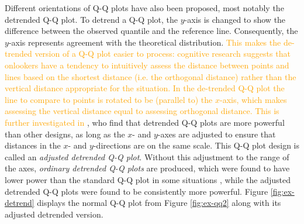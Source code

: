 Different orientations of Q-Q plots have also been proposed, most
notably the detrended Q-Q plot. To detrend a Q-Q plot, the \(y\)-axis is
changed to show the difference between the observed quantile and the
reference line. Consequently, the \(y\)-axis represents agreement with
the theoretical distribution.
{\textcolor{orange}{This makes the de-trended version of a Q-Q plot  easier to process: cognitive research \citep{sineillusion, robbins, cleveland} suggests that onlookers have a tendency to intuitively assess the distance between points and lines based on the shortest distance (i.e. the orthogonal distance) rather than the vertical distance appropriate for the situation. In the de-trended Q-Q plot the line to compare to points  is rotated to be (parallel to) the $x$-axis, which makes assessing the vertical distance equal to assessing orthogonal distance. }}
{\textcolor{orange}{This is further investigated in}}
\citet{Loy2016-fg}, who find that detrended Q-Q plots are more powerful
than other designs, as long as the \(x\)- and \(y\)-axes are adjusted to
ensure that distances in the \(x\)- and \(y\)-directions are on the same
scale. This Q-Q plot design is called an \emph{adjusted detrended Q-Q
plot}. Without this adjustment to the range of the axes, \emph{ordinary
detrended Q-Q plots} are produced, which were found to have lower power
than the standard Q-Q plot in some situations \citep{Loy2016-fg}, while
the adjusted detrended Q-Q plots were found to be consistently more
powerful. Figure \ref{fig:ex-detrend} displays the normal Q-Q plot from
Figure \ref{fig:ex-qq2} along with its adjusted detrended version.

